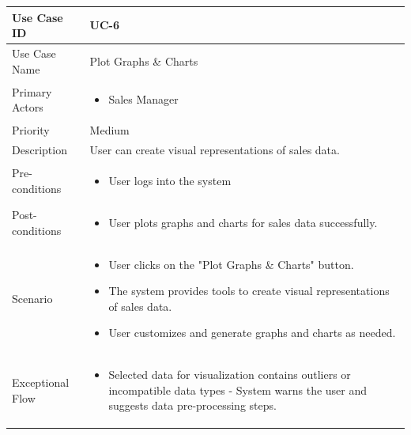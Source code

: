 \begin{tabularx}{\textwidth}{|l|X|}
\hline
Use Case ID & UC-6 \\
\hline
Use Case Name & Plot Graphs \& Charts\\
\hline
Primary Actors & 
\begin{itemize}
    \item Sales Manager
\end{itemize} \\
\hline
Priority & Medium \\
\hline
Description & User can create visual representations of sales data. \\
\hline
Pre-conditions & 
\begin{itemize}    
    \item User logs into the system
\end{itemize} \\
\hline
Post-conditions & 
\begin{itemize}
    \item User plots graphs and charts for sales data successfully.
\end{itemize} \\
\hline
Scenario & 
\begin{itemize}
    \item User clicks on the "Plot Graphs \& Charts" button. 
    \item The system provides tools to create visual representations of sales data.
    \item User customizes and generate graphs and charts as needed.
\end{itemize}\\
\hline
Exceptional Flow & 
\begin{itemize}
    \item Selected data for visualization contains outliers or incompatible data types - System warns the user and suggests data pre-processing steps. 
\end{itemize}\\
\hline
\end{tabularx}

\vspace{12pt}

